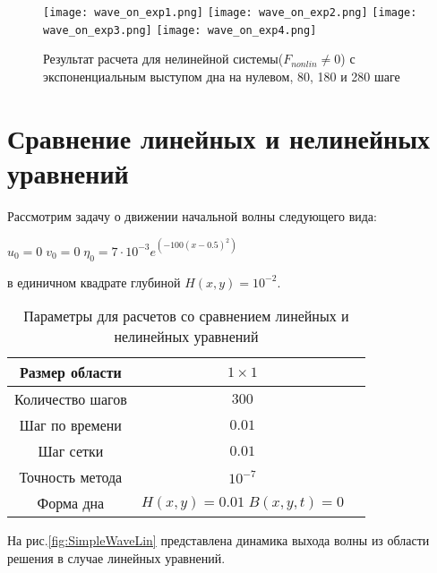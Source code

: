 \newpage
\begin{figure}[htp]
    \centering
    \vspace{12em}
    \texttt{[image: wave\_on\_exp1.png]}
    \texttt{[image: wave\_on\_exp2.png]}
    \texttt{[image: wave\_on\_exp3.png]}
    \texttt{[image: wave\_on\_exp4.png]}
    \caption{Результат расчета для нелинейной системы($F_{nonlin}\neq 0$) с экспоненциальным выступом дна на нулевом, 80, 180 и 280 шаге}
    \label{fig:ExpBottom}
\end{figure}

\newpage
\addtocounter{section}{1}
\setcounter{equation}{0}
\setcounter{subsection}{0}
\section*{Сравнение линейных и нелинейных уравнений} 

Рассмотрим задачу о движении начальной волны следующего вида:

$u_0=0\;v_0=0\;\eta_0=7 \cdot 10^{-3}e^{(-100 (x-0.5)^2)}$

в единичном квадрате глубиной $H(x,y)=10^{-2}$.

\begin{table}[H]
    \label{tab:FirstResult}
    \caption{Параметры для расчетов со сравнением линейных и нелинейных уравнений}
    \begin{center}
	\begin{tabular}{|c|c|c|}
	    \hline
	    Размер области & $1\times1$\\
	    \hline
	    Количество шагов & $300$\\
	    \hline
	    Шаг по времени & $0.01$\\
	    \hline
	    Шаг сетки & $0.01$\\
	    \hline
	    Точность метода & $10^{-7}$\\
	    \hline
	    Форма дна & $H(x,y)=0.01\;B(x,y,t)=0$\\
	    \hline
	\end{tabular}
    \end{center}
\end{table}

На рис.\ref{fig:SimpleWaveLin} представлена динамика выхода волны из области решения в случае линейных уравнений.

